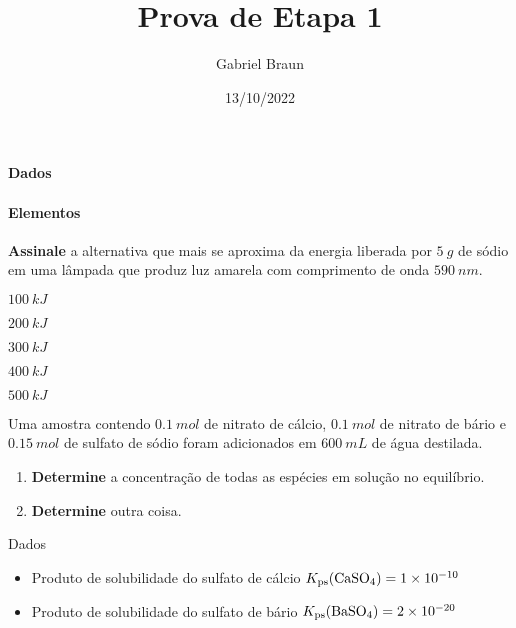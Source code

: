 \documentclass[prova]{braun}
\title{Prova de Etapa 1}
\author{Gabriel Braun}
\date{13/10/2022}
\begin{document}
\maketitle

\paragraph{Dados}

\paragraph{Elementos}
\begin{center}
\end{center}

\hspace{2em}

\begin{problem}[
	points={10}
]
\textbf{Assinale} a alternativa que mais se aproxima da energia liberada
por {\(\qty{5}{g}\)} de sódio em uma lâmpada que produz luz amarela com
comprimento de onda {\(\qty{590}{nm}\)}.

\begin{choices}
\item {\(\qty{100}{kJ}\)}

\item {\(\qty{200}{kJ}\)}

\item {\(\qty{300}{kJ}\)}

\item {\(\qty{400}{kJ}\)}

\item {\(\qty{500}{kJ}\)}

\end{choices}

\end{problem}

\newpage

\begin{problem}[
	points={10}
]
Uma amostra contendo {\(\qty{0,1}{mol}\)} de nitrato de cálcio,
{\(\qty{0,1}{mol}\)} de nitrato de bário e {\(\qty{0,15}{mol}\)} de
sulfato de sódio foram adicionados em {\(\qty{600}{mL}\)} de água
destilada.

\begin{enumerate}
\def\labelenumi{\alph{enumi}.}
\tightlist
\item
  \textbf{Determine} a concentração de todas as espécies em solução no
  equilíbrio.
\item
  \textbf{Determine} outra coisa.
\end{enumerate}

Dados

\begin{itemize}
\tightlist
\item
  Produto de solubilidade do sulfato de cálcio
  {\(K_\mathrm{ps}(\ce{CaSO4}) = \num{1e-10}\)}
\item
  Produto de solubilidade do sulfato de bário
  {\(K_\mathrm{ps}(\ce{BaSO4}) = \num{2e-20}\)}
\end{itemize}

\end{problem}
\end{document}
